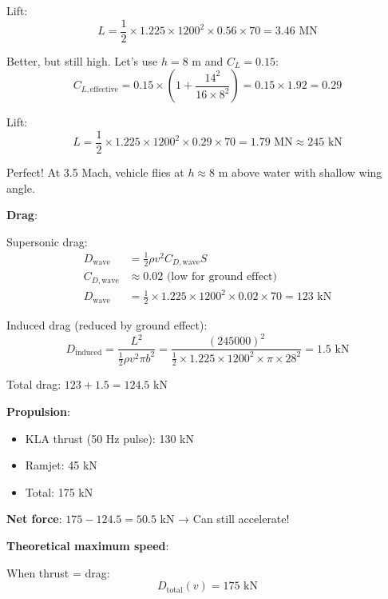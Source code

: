 \documentclass[12pt,a4paper]{article}
\begin{document}
Lift:
\begin{equation}
L = \frac{1}{2} \times 1.225 \times 1200^2 \times 0.56 \times 70 = 3.46 \text{ MN}
\end{equation}

Better, but still high. Let's use $h = 8$ m and $C_L = 0.15$:
\begin{equation}
C_{L,\text{effective}} = 0.15 \times \left(1 + \frac{14^2}{16 \times 8^2}\right) = 0.15 \times 1.92 = 0.29
\end{equation}

Lift:
\begin{equation}
L = \frac{1}{2} \times 1.225 \times 1200^2 \times 0.29 \times 70 = 1.79 \text{ MN} \approx 245 \text{ kN}
\end{equation}

Perfect! At 3.5 Mach, vehicle flies at $h \approx 8$ m above water with shallow wing angle.

\textbf{Drag}:

Supersonic drag:
\begin{align}
D_{\text{wave}} &= \frac{1}{2} \rho v^2 C_{D,\text{wave}} S \\
C_{D,\text{wave}} &\approx 0.02 \text{ (low for ground effect)} \\
D_{\text{wave}} &= \frac{1}{2} \times 1.225 \times 1200^2 \times 0.02 \times 70 = 123 \text{ kN}
\end{align}

Induced drag (reduced by ground effect):
\begin{equation}
D_{\text{induced}} = \frac{L^2}{\frac{1}{2} \rho v^2 \pi b^2} = \frac{(245000)^2}{\frac{1}{2} \times 1.225 \times 1200^2 \times \pi \times 28^2} = 1.5 \text{ kN}
\end{equation}

Total drag: $123 + 1.5 = 124.5$ kN

\textbf{Propulsion}:

\begin{itemize}
\item KLA thrust (50 Hz pulse): 130 kN
\item Ramjet: 45 kN
\item Total: 175 kN
\end{itemize}

\textbf{Net force}: $175 - 124.5 = 50.5$ kN → Can still accelerate!

\textbf{Theoretical maximum speed}:

When thrust = drag:
\begin{equation}
D_{\text{total}}(v) = 175 \text{ kN}
\end{equation}
\end{document}

